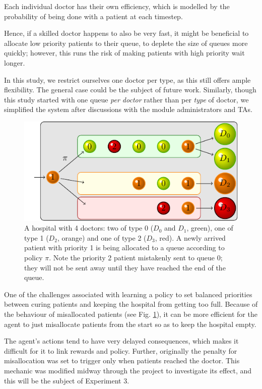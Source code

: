 \documentclass[11point]{article}
\begin{document}
Each individual doctor has their own efficiency, which is modelled by the probability of being done with a patient at each timestep.

Hence, if a skilled doctor happens to also be very fast, it might be beneficial to allocate low priority patients to their queue, to deplete the size of queues more quickly;
however, this runs the risk of making patients with high priority wait longer.

In this study, we restrict ourselves one doctor per type, as this still offers ample flexibility. The general case could be the subject of future work.
Similarly, though this study started with one queue \emph{per doctor} rather than per \emph{type} of doctor, we simplified the system after discussions with the module administrators and TAs.

\begin{figure}
    \centering
    \includegraphics[width=0.9\columnwidth]{figures/hospital.pdf}
    \caption{A hospital with 4 doctors: two of type 0 ($D_0$ and $D_1$, green), one of type 1 ($D_2$, orange) and one of type 2 ($D_3$, red). A newly arrived patient with priority 1 is being allocated to a queue according to policy $\pi$.
    Note the priority 2 patient mistakenly sent to queue 0; they will not be sent away until they have reached the end of the queue.}
    \label{fig:hospital_diagram}
\end{figure}

One of the challenges associated with learning a policy to set balanced priorities between curing patients and keeping the hospital from getting too full.
Because of the behaviour of misallocated patients (see Fig. \ref{fig:hospital_diagram}), it can be more efficient for the agent to just misallocate patients from the start so as to keep the hospital empty.

The agent's actions tend to have very delayed consequences, which makes it difficult for it to link rewards and policy.
Further, originally the penalty for misallocation was set to trigger only when patients reached the doctor.
This mechanic was modified midway through the project to investigate its effect, and this will be the subject of Experiment 3.
\end{document}
